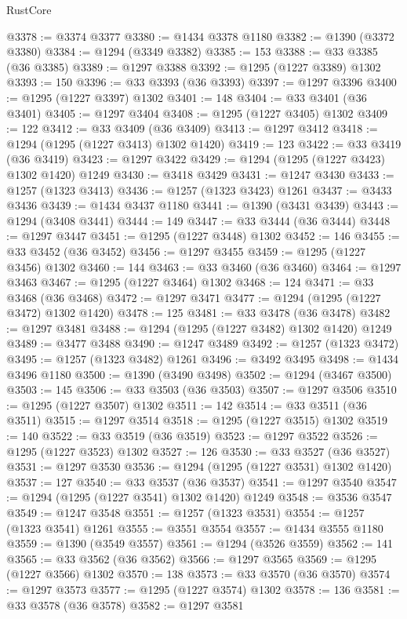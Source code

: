 \begin{lexlean}{RustCore}
\begin{coremodule}
@3378 := @3374 @3377
@3380 := @1434 @3378 @1180
@3382 := @1390 (@3372 @3380)
@3384 := @1294 (@3349 @3382)
@3385 := 153
@3388 := @33 @3385 (@36 @3385)
@3389 := @1297 @3388
@3392 := @1295 (@1227 @3389) @1302
@3393 := 150
@3396 := @33 @3393 (@36 @3393)
@3397 := @1297 @3396
@3400 := @1295 (@1227 @3397) @1302
@3401 := 148
@3404 := @33 @3401 (@36 @3401)
@3405 := @1297 @3404
@3408 := @1295 (@1227 @3405) @1302
@3409 := 122
@3412 := @33 @3409 (@36 @3409)
@3413 := @1297 @3412
@3418 := @1294 (@1295 (@1227 @3413) @1302 @1420)
@3419 := 123
@3422 := @33 @3419 (@36 @3419)
@3423 := @1297 @3422
@3429 := @1294 (@1295 (@1227 @3423) @1302 @1420) @1249
@3430 := @3418 @3429
@3431 := @1247 @3430
@3433 := @1257 (@1323 @3413)
@3436 := @1257 (@1323 @3423) @1261
@3437 := @3433 @3436
@3439 := @1434 @3437 @1180
@3441 := @1390 (@3431 @3439)
@3443 := @1294 (@3408 @3441)
@3444 := 149
@3447 := @33 @3444 (@36 @3444)
@3448 := @1297 @3447
@3451 := @1295 (@1227 @3448) @1302
@3452 := 146
@3455 := @33 @3452 (@36 @3452)
@3456 := @1297 @3455
@3459 := @1295 (@1227 @3456) @1302
@3460 := 144
@3463 := @33 @3460 (@36 @3460)
@3464 := @1297 @3463
@3467 := @1295 (@1227 @3464) @1302
@3468 := 124
@3471 := @33 @3468 (@36 @3468)
@3472 := @1297 @3471
@3477 := @1294 (@1295 (@1227 @3472) @1302 @1420)
@3478 := 125
@3481 := @33 @3478 (@36 @3478)
@3482 := @1297 @3481
@3488 := @1294 (@1295 (@1227 @3482) @1302 @1420) @1249
@3489 := @3477 @3488
@3490 := @1247 @3489
@3492 := @1257 (@1323 @3472)
@3495 := @1257 (@1323 @3482) @1261
@3496 := @3492 @3495
@3498 := @1434 @3496 @1180
@3500 := @1390 (@3490 @3498)
@3502 := @1294 (@3467 @3500)
@3503 := 145
@3506 := @33 @3503 (@36 @3503)
@3507 := @1297 @3506
@3510 := @1295 (@1227 @3507) @1302
@3511 := 142
@3514 := @33 @3511 (@36 @3511)
@3515 := @1297 @3514
@3518 := @1295 (@1227 @3515) @1302
@3519 := 140
@3522 := @33 @3519 (@36 @3519)
@3523 := @1297 @3522
@3526 := @1295 (@1227 @3523) @1302
@3527 := 126
@3530 := @33 @3527 (@36 @3527)
@3531 := @1297 @3530
@3536 := @1294 (@1295 (@1227 @3531) @1302 @1420)
@3537 := 127
@3540 := @33 @3537 (@36 @3537)
@3541 := @1297 @3540
@3547 := @1294 (@1295 (@1227 @3541) @1302 @1420) @1249
@3548 := @3536 @3547
@3549 := @1247 @3548
@3551 := @1257 (@1323 @3531)
@3554 := @1257 (@1323 @3541) @1261
@3555 := @3551 @3554
@3557 := @1434 @3555 @1180
@3559 := @1390 (@3549 @3557)
@3561 := @1294 (@3526 @3559)
@3562 := 141
@3565 := @33 @3562 (@36 @3562)
@3566 := @1297 @3565
@3569 := @1295 (@1227 @3566) @1302
@3570 := 138
@3573 := @33 @3570 (@36 @3570)
@3574 := @1297 @3573
@3577 := @1295 (@1227 @3574) @1302
@3578 := 136
@3581 := @33 @3578 (@36 @3578)
@3582 := @1297 @3581

\end{coremodule}
\end{lexlean}
